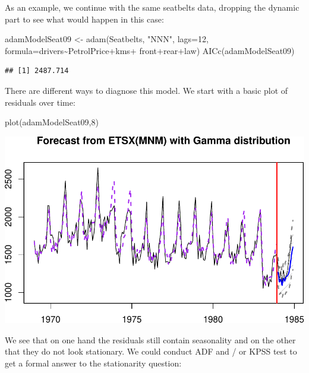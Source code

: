 \documentclass[
]{book}
\newenvironment{Shaded}{\begin{snugshade}}{\end{snugshade}}
\newcommand{\AttributeTok}[1]{\textcolor[rgb]{0.77,0.63,0.00}{#1}}
\newcommand{\DecValTok}[1]{\textcolor[rgb]{0.00,0.00,0.81}{#1}}
\newcommand{\FunctionTok}[1]{\textcolor[rgb]{0.00,0.00,0.00}{#1}}
\newcommand{\NormalTok}[1]{#1}
\newcommand{\OtherTok}[1]{\textcolor[rgb]{0.56,0.35,0.01}{#1}}
\newcommand{\SpecialCharTok}[1]{\textcolor[rgb]{0.00,0.00,0.00}{#1}}
\newcommand{\StringTok}[1]{\textcolor[rgb]{0.31,0.60,0.02}{#1}}
\theoremstyle{definition}
\theoremstyle{definition}
\theoremstyle{definition}
\theoremstyle{definition}
\theoremstyle{remark}
\begin{document}
As an example, we continue with the same seatbelts data, dropping the dynamic part to see what would happen in this case:

\begin{Shaded}
\begin{Highlighting}[]
\NormalTok{adamModelSeat09 }\OtherTok{\textless{}{-}} \FunctionTok{adam}\NormalTok{(Seatbelts, }\StringTok{"NNN"}\NormalTok{, }\AttributeTok{lags=}\DecValTok{12}\NormalTok{,}
                        \AttributeTok{formula=}\NormalTok{drivers}\SpecialCharTok{\textasciitilde{}}\NormalTok{PetrolPrice}\SpecialCharTok{+}\NormalTok{kms}\SpecialCharTok{+}
\NormalTok{                          front}\SpecialCharTok{+}\NormalTok{rear}\SpecialCharTok{+}\NormalTok{law)}
\FunctionTok{AICc}\NormalTok{(adamModelSeat09)}
\end{Highlighting}
\end{Shaded}

\begin{verbatim}
## [1] 2487.714
\end{verbatim}

There are different ways to diagnose this model. We start with a basic plot of residuals over time:

\begin{Shaded}
\begin{Highlighting}[]
\FunctionTok{plot}\NormalTok{(adamModelSeat09,}\DecValTok{8}\NormalTok{)}
\end{Highlighting}
\end{Shaded}

\includegraphics{adam_files/figure-latex/unnamed-chunk-151-1.pdf}

We see that on one hand the residuals still contain seasonality and on the other that they do not look stationary. We could conduct ADF and / or KPSS test to get a formal answer to the stationarity question:
\end{document}
